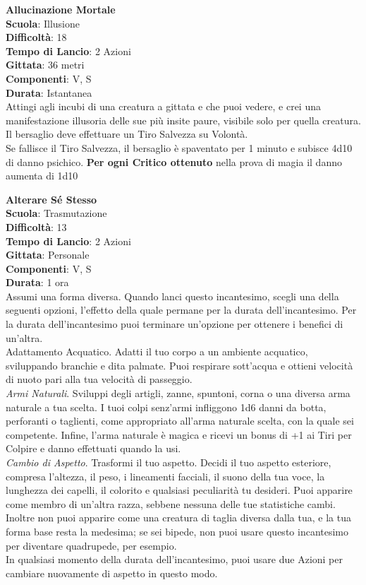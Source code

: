 \begin{multicols}{2}
\medskip\textbf{Allucinazione Mortale}\\
\textbf{Scuola}: Illusione\\
\textbf{Difficoltà}: 18\\
\textbf{Tempo di Lancio}: 2 Azioni\\
\textbf{Gittata}: 36 metri\\
\textbf{Componenti}: V, S\\
\textbf{Durata}: Istantanea\\
Attingi agli incubi di una creatura a gittata e che puoi vedere, e crei una manifestazione illusoria delle sue più insite paure, visibile solo per quella creatura. Il bersaglio deve effettuare un Tiro Salvezza su Volontà.\\
Se fallisce il Tiro Salvezza, il bersaglio è spaventato per 1 minuto e subisce 4d10 di danno psichico. 
\textbf{Per ogni Critico ottenuto} nella prova di magia il danno aumenta di 1d10

\medskip\textbf{Alterare Sé Stesso}\\
\textbf{Scuola}: Trasmutazione\\
\textbf{Difficoltà}: 13\\
\textbf{Tempo di Lancio}: 2 Azioni\\
\textbf{Gittata}: Personale\\
\textbf{Componenti}: V, S\\
\textbf{Durata}: 1 ora\\
Assumi una forma diversa. Quando lanci questo incantesimo, scegli una della seguenti opzioni, l'effetto della quale permane per la durata dell'incantesimo. Per la durata dell'incantesimo puoi terminare un'opzione per ottenere i benefici di un'altra.\\
Adattamento Acquatico. Adatti il tuo corpo a un ambiente acquatico, sviluppando branchie e dita palmate. Puoi respirare sott'acqua e ottieni velocità di nuoto pari alla tua velocità di passeggio.\\
\textit{Armi Naturali}. Sviluppi degli artigli, zanne, spuntoni, corna o una diversa arma naturale a tua scelta. I tuoi colpi senz'armi infliggono 1d6 danni da botta, perforanti o taglienti, come appropriato all'arma naturale scelta, con la quale sei competente. Infine, l'arma naturale è magica e ricevi un bonus di +1 ai Tiri per Colpire e danno effettuati quando la usi.\\
\textit{Cambio di Aspetto}. Trasformi il tuo aspetto. Decidi il tuo aspetto esteriore, compresa l'altezza, il peso, i lineamenti facciali, il suono della tua voce, la lunghezza dei capelli, il colorito e qualsiasi peculiarità tu desideri. Puoi apparire come membro di un'altra razza, sebbene nessuna delle tue statistiche cambi. Inoltre non puoi apparire come una creatura di taglia diversa dalla tua, e la tua forma base resta la medesima; se sei bipede, non puoi usare questo incantesimo per diventare quadrupede, per esempio.\\
In qualsiasi momento della durata dell'incantesimo, puoi usare due Azioni per cambiare nuovamente di aspetto in questo modo.\\


\end{multicols}
